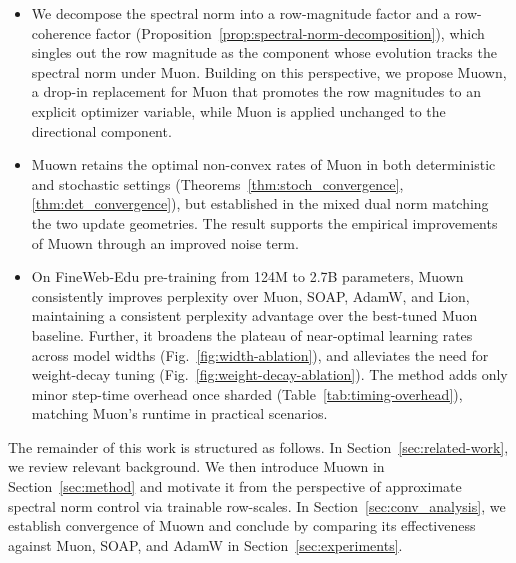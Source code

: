 \documentclass{article}
\newcommand{\algname}{Muown}
\begin{document}
\begin{itemize}
    \item We decompose the spectral norm into a row-magnitude factor and a row-coherence factor (Proposition~\ref{prop:spectral-norm-decomposition}), which singles out the row magnitude as the component whose evolution tracks the spectral norm under Muon. Building on this perspective, we propose \algname{}, a drop-in replacement for Muon that promotes the row magnitudes to an explicit optimizer variable, while Muon is applied unchanged to the directional component.
    \item \algname{} retains the optimal non-convex rates of Muon in both deterministic and stochastic settings (Theorems~\ref{thm:stoch_convergence}, \ref{thm:det_convergence}), but established in the mixed dual norm matching the two update geometries. The result supports the empirical improvements of \algname{} through an improved noise term.
    \item On FineWeb-Edu pre-training from 124M to 2.7B parameters, \algname{} consistently improves perplexity over Muon, SOAP, AdamW, and Lion, maintaining a consistent perplexity advantage over the best-tuned Muon baseline. Further, it broadens the plateau of near-optimal learning rates across model widths (Fig.\ \ref{fig:width-ablation}), and alleviates the need for weight-decay tuning (Fig.\ \ref{fig:weight-decay-ablation}). The method adds only minor step-time overhead once sharded (Table~\ref{tab:timing-overhead}), matching Muon's runtime in practical scenarios.
\end{itemize}

The remainder of this work is structured as follows. In Section~\ref{sec:related-work}, we review relevant background. We then introduce \algname{} in Section~\ref{sec:method} and motivate it from the perspective of approximate spectral norm control via trainable row-scales. In Section~\ref{sec:conv_analysis}, we establish convergence of \algname{} and conclude by comparing its effectiveness against Muon, SOAP, and AdamW in Section~\ref{sec:experiments}. 
\end{document}
